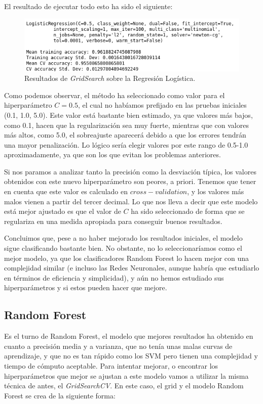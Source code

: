\documentclass[11pt,a4paper]{article}
\begin{document}
El resultado de ejecutar todo esto ha sido el siguiente:

\begin{figure}[H]
    \centering
    \includegraphics[scale=0.6]{img/gs-lr.png}
    \caption{Resultados de \textit{GridSearch} sobre la Regresión Logística.}
    \label{fig:gs-lr}
\end{figure}

Como podemos observar, el método ha seleccionado como valor para el hiperparámetro $C = 0.5$, el cual no habíamos prefijado en las pruebas
iniciales (0.1, 1.0, 5.0). Este valor está bastante bien estimado, ya que valores más bajos, como 0.1, hacen que la regularización sea muy
fuerte, mientras que con valores más altos, como 5.0, el sobreajuste aparecerá debido a que los errores tendrán una mayor penalización. Lo
lógico sería elegir valores por este rango de 0.5-1.0 aproximadamente, ya que son los que evitan los problemas anteriores.

Si nos paramos a analizar tanto la precisión como la desviación típica, los valores obtenidos con este nuevo hiperparámetro son peores, a
priori. Tenemos que tener en cuenta que este valor es calculado en $cross-validation$, y los valores más malos vienen a partir del tercer
decimal. Lo que nos lleva a decir que este modelo está mejor ajustado es que el valor de $C$ ha sido seleccionado de forma que se
regulariza en una medida apropiada para conseguir buenos resultados.

Concluimos que, pese a no haber mejorado los resultados iniciales, el modelo sigue clasificando bastante bien. No obstante, no lo
seleccionaríamos como el mejor modelo, ya que los clasificadores Random Forest lo hacen mejor con una complejidad similar (e incluso las
Redes Neuronales, aunque habría que estudiarlo en términos de eficiencia y simplicidad), y aún no hemos estudiado sus hiperparámetros y si
estos pueden hacer que mejore.

\subsection{Random Forest}

Es el turno de Random Forest, el modelo que mejores resultados ha obtenido en cuanto a precisión media y a varianza, que no tenía unas
malas curvas de aprendizaje, y que no es tan rápido como los SVM pero tienen una complejidad y tiempo de cómputo aceptable. Para intentar
mejorar, o encontrar los hiperparámetros que mejor se ajustan a este modelo vamos a utilizar la misma técnica de antes, el
\textit{GridSearchCV}. En este caso, el grid y el modelo Random Forest se crea de la siguiente forma:
\end{document}
